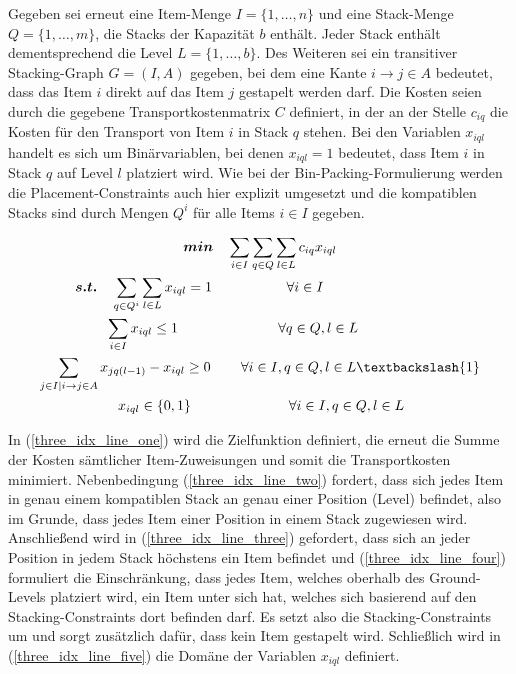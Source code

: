 \vfill
\pagebreak

Gegeben sei erneut eine Item-Menge $I = \{1, \dotsc, n\}$ und eine Stack-Menge $Q = \{1, \dotsc, m\}$, die Stacks der Kapazität $b$ enthält.
Jeder Stack enthält dementsprechend die Level $L = \{1, \dotsc, b\}$. Des Weiteren sei ein transitiver Stacking-Graph
$G = (I, A)$ gegeben, bei dem eine Kante $i \rightarrow j \in A$ bedeutet, dass das Item $i$ direkt auf das Item $j$ gestapelt werden darf.
Die Kosten seien durch die gegebene Transportkostenmatrix $C$ definiert, in der an der Stelle $c_{iq}$ die Kosten für den
Transport von Item $i$ in Stack $q$ stehen. Bei den Variablen $x_{iql}$ handelt es sich um Binärvariablen,
bei denen $x_{iql} = 1$ bedeutet, dass Item $i$ in Stack $q$ auf Level $l$ platziert wird. Wie bei der Bin-Packing-Formulierung
werden die Placement-Constraints auch hier explizit umgesetzt und die kompatiblen Stacks sind durch Mengen $Q^i$ für
alle Items $i \in I$ gegeben.

\begin{gather}
\boldsymbol{min} \quad \sum_{i \in I} \sum_{q \in Q} \sum_{l \in L} c_{iq} x_{iql} \label{three_idx_line_one} \\
\boldsymbol{s.t.} \quad \sum_{q \in Q^i} \sum_{l \in L} x_{iql} = 1 \quad\thinspace\thinspace\quad\quad\quad\quad \forall i \in I \thinspace\thinspace\quad\quad\quad\quad\quad\quad\quad\quad\thinspace\thinspace \label{three_idx_line_two} \\
\sum_{i \in I} x_{iql} \leq 1 \thinspace\quad\quad\quad\quad\quad\quad\quad \forall q \in Q, l \in L \thinspace\thinspace\thinspace\thinspace\quad\quad\quad\thinspace \label{three_idx_line_three} \\
\sum_{j \in I | i \rightarrow j \in A} x_{jq(l-1)} - x_{iql} \geq 0 \thinspace\quad\quad \forall i \in I, q \in Q, l \in L \textbackslash \{1\}
\label{three_idx_line_four} \\
\quad\quad x_{iql} \in \{0, 1\} \quad\quad\quad\quad\quad\quad\quad \forall i \in I, q \in Q, l \in L \quad\thinspace\thinspace\thinspace\thinspace\thinspace \label{three_idx_line_five}
\end{gather}

In (\ref{three_idx_line_one}) wird die Zielfunktion definiert, die erneut die Summe der Kosten sämtlicher Item-Zuweisungen
und somit die Transportkosten minimiert.
Nebenbedingung (\ref{three_idx_line_two}) fordert, dass sich jedes Item in genau einem kompatiblen Stack an genau
einer Position (Level) befindet,
also im Grunde, dass jedes Item einer Position in einem Stack zugewiesen wird.
Anschließend wird in (\ref{three_idx_line_three}) gefordert, dass sich an jeder Position in jedem Stack höchstens ein Item befindet und
(\ref{three_idx_line_four}) formuliert die Einschränkung, dass jedes Item, welches oberhalb des Ground-Levels platziert wird,
ein Item unter sich hat, welches sich basierend auf den Stacking-Constraints dort befinden darf.
Es setzt also die Stacking-Constraints um und sorgt zusätzlich dafür, dass kein Item  gestapelt wird.
Schließlich wird in (\ref{three_idx_line_five}) die Domäne der Variablen $x_{iql}$ definiert.

